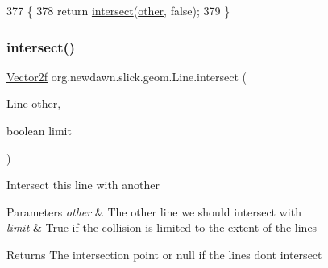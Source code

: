 \begin{DoxyCode}
377                                           \{
378         \textcolor{keywordflow}{return} \mbox{\hyperlink{classorg_1_1newdawn_1_1slick_1_1geom_1_1_line_a9b75c7b1fea8dc4f0e2382205597335c}{intersect}}(\mbox{\hyperlink{classorg_1_1newdawn_1_1slick_1_1geom_1_1_line_a9e03a0c3036406f4c22a6486a23d0b4f}{other}}, \textcolor{keyword}{false});
379     \}
\end{DoxyCode}
\mbox{\label{classorg_1_1newdawn_1_1slick_1_1geom_1_1_line_a1dad101432f78c584c503d2e0a78bb99}} 
\subsubsection{\texorpdfstring{intersect()}{intersect()}\hspace{0.1cm}{\footnotesize\ttfamily [2/3]}}
{\footnotesize\ttfamily \mbox{\hyperlink{classorg_1_1newdawn_1_1slick_1_1geom_1_1_vector2f}{Vector2f}} org.\+newdawn.\+slick.\+geom.\+Line.\+intersect (\begin{DoxyParamCaption}\item[{\mbox{\hyperlink{classorg_1_1newdawn_1_1slick_1_1geom_1_1_line}{Line}}}]{other,  }\item[{boolean}]{limit }\end{DoxyParamCaption})\hspace{0.3cm}{\ttfamily [inline]}}

Intersect this line with another


\begin{DoxyParams}{Parameters}
{\em other} & The other line we should intersect with \\
\hline
{\em limit} & True if the collision is limited to the extent of the lines \\
\hline
\end{DoxyParams}
\begin{DoxyReturn}{Returns}
The intersection point or null if the lines don\textquotesingle{}t intersect 
\end{DoxyReturn}


